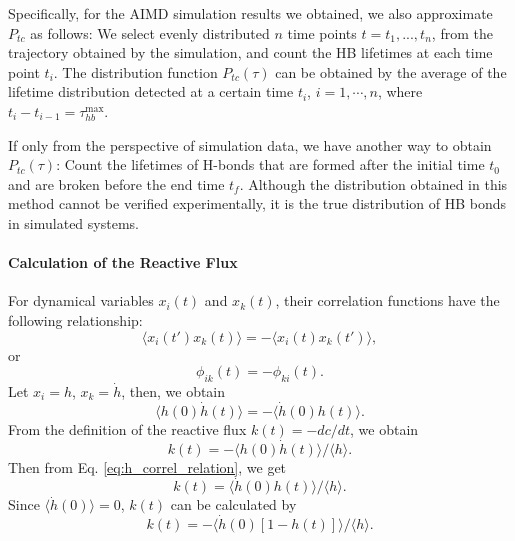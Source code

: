 Specifically, for the AIMD simulation results we obtained, we also approximate $P_{tc}$ as follows: 
We select evenly distributed $n$ time points $t=t_1,...,t_n$, from the trajectory obtained by the simulation, 
and count the HB lifetimes at each time point $t_i$.
The distribution function $P_{tc}(\tau)$ 
can be obtained by the average of the lifetime distribution detected at a certain time $t_i$, $i=1,\cdots, n$, 
where $t_i-t_{i-1} = \tau_{hb}^{\max}$. 

If only from the perspective of simulation data, we have another way to obtain $P_{tc}(\tau)$: 
Count the lifetimes of H-bonds that are formed after the initial time $t_0$ and are broken before the end time $t_f$.
Although the distribution obtained in this method cannot be verified experimentally, 
it is the true distribution of HB bonds in simulated systems. 


\paragraph{Calculation of the Reactive Flux}\label{calc_rf}
For dynamical variables $x_i(t)$ and $x_k(t)$, their correlation functions have the following relationship:\cite{Landau1980}
\begin{equation}
\langle x_i(t') x_k(t)\rangle = -\langle x_i(t) x_k(t')\rangle,
\label{eq:correlation_relation}
\end{equation}
or 
\begin{equation}
\phi_{ik}(t) = -\phi_{ki}(t). \nonumber
\label{eq:correlation_relation2}
\end{equation}
Let $x_i = h$, $x_k = \dot h$,
then, we obtain
\begin{equation}
\langle h(0) \dot{h}(t)\rangle=-\langle\dot{h}(0) h(t)\rangle. 
\label{eq:h_correl_relation}
\end{equation}
From the definition of the reactive flux $k(t) = -dc/dt$, we obtain 
\begin{equation}
k(t)=-\langle h(0) \dot{h}(t)\rangle /\langle h\rangle. 
\label{eq:rf1}
\end{equation}
Then from Eq. \ref{eq:h_correl_relation},
we get 
\begin{equation}
k(t) =  \langle \dot{h}(0)h(t)\rangle /\langle h\rangle. \nonumber
\label{eq:rf2}
\end{equation}
Since $\langle\dot{h}(0)\rangle=0$, $k(t)$ can be calculated by
\begin{equation}
k(t) = - \langle \dot{h}(0)[1-h(t)]\rangle /\langle h\rangle.
\label{eq:rf3}
\end{equation}

